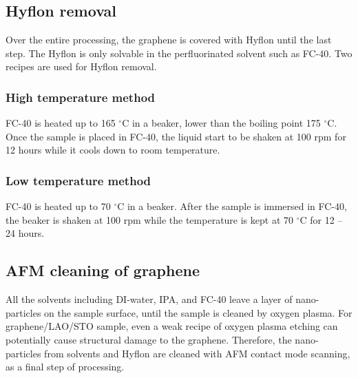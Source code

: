 \documentclass[pdflatex, sectionletters, 12pt, final, phd]{pittetd}    %
\begin{document}
\subsection{Hyflon removal}

Over the entire processing, the graphene is covered with Hyflon until the last step. The Hyflon is only solvable in the perfluorinated solvent such as FC-40. Two recipes are used for Hyflon removal. 

\subsubsection{High temperature method} FC-40 is heated up to 165 $^{\circ}$C in a beaker, lower than the boiling point 175 $^{\circ}$C. Once the sample is placed in FC-40, the liquid start to be shaken at 100 rpm for 12 hours while it cools down to room temperature.

\subsubsection{Low temperature method} FC-40 is heated up to 70 $^{\circ}$C in a beaker. After the sample is immersed in FC-40, the beaker is shaken at 100 rpm while the temperature is kept at 70 $^{\circ}$C for 12 -- 24 hours.

\subsection{AFM cleaning of graphene}

All the solvents including DI-water, IPA, and FC-40 leave a layer of nano-particles on the sample surface, until the sample is cleaned by oxygen plasma. For graphene/LAO/STO sample, even a weak recipe of oxygen plasma etching can potentially cause structural damage to the graphene. Therefore, the nano-particles from solvents and Hyflon are cleaned with AFM contact mode scanning, as a final step of processing. 
\end{document}
